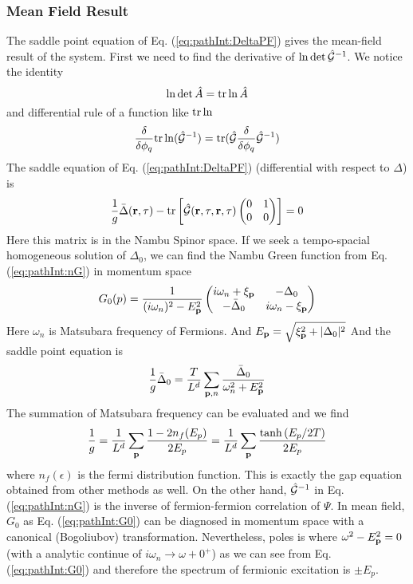 \subsubsection{Mean Field Result}
The saddle point equation of Eq. (\ref{eq:pathInt:DeltaPF}) gives the mean-field result of the system.  First we need to find the derivative of $\ln\det\hat{\mathcal{G}}^{-1}$.  We notice the identity
\begin{equation}
\ln\det\hat{A}=\text{tr}\ln\hat{A}
\end{equation}
and differential rule of a function like $\text{tr}\ln$
\begin{equation}\label{eq:pathInt:diffTr}
\frac{\delta}{\delta\phi_q}\text{tr}\ln(\hat{\mathcal{G}}^{-1})=\text{tr}(\hat{\mathcal{G}}\frac{\delta}{\delta\phi_q}\hat{\mathcal{G}}^{-1})
\end{equation}
The saddle equation of Eq. (\ref{eq:pathInt:DeltaPF}) (differential with respect to $\Delta$) is
\begin{equation}
\frac{1}{g}\bar{\Delta}(\mathbf{r},\tau)-\text{tr}\left[\hat{\mathcal{G}}(\mathbf{r},\tau,\mathbf{r},\tau)\begin{pmatrix}0&1\\0&0\end{pmatrix}\right]=0
\end{equation}
Here this matrix is in the Nambu Spinor space.  If we seek a tempo-spacial homogeneous solution of $\Delta_0$, we can find the Nambu Green function from Eq. (\ref{eq:pathInt:nG}) in momentum space
\begin{equation}\label{eq:pathInt:G0}
G_0(p)=\frac{1}{(i\omega_n)^2-E_{\mathbf{p}}^2}
\begin{pmatrix}
	i\omega_n+\xi_{\mathbf{p}}&-\Delta_0\\
	-\bar{\Delta}_0&i\omega_n-\xi_{\mathbf{p}}
\end{pmatrix}
\end{equation}
Here $\omega_n$ is Matsubara frequency of Fermions.   And $E_{\mathbf{p}}=\sqrt{\xi_{\mathbf{p}}^2+\lvert{\Delta_0}\rvert^2}$ And the saddle point equation is 
\begin{equation}
\frac{1}{g}\bar{\Delta}_0=\frac{T}{L^d}\sum_{\mathbf{p},n}\frac{\bar\Delta_0}{\omega_n^2+E_{\mathbf{p}}^2}
\end{equation}
The summation of Matsubara frequency can be evaluated and we find 
\begin{equation}
\frac{1}{g}=\frac{1}{L^d}\sum_{\mathbf{p}}\frac{1-2n_f(E_p)}{2E_p}=\frac{1}{L^d}\sum_{\mathbf{p}}\frac{\tanh{(E_p/2T)}}{2E_p}
\label{eq:pathInt:gap}
\end{equation}
where $n_f(\epsilon)$ is the fermi distribution function.  This is exactly the gap equation obtained from other methods as well.  On the other hand, $\hat{\mathcal{G}}^{-1}$ in Eq. (\ref{eq:pathInt:nG})  is the inverse of fermion-fermion correlation of $\Psi$.  In mean field, $G_{0}$ as Eq. (\ref{eq:pathInt:G0}) can be diagnosed in momentum space with a canonical (Bogoliubov) transformation.  Nevertheless, poles is where  $\omega^2-E_{\mathbf{p}}^2=0$ (with a analytic continue of $i\omega_{n}\rightarrow\omega+0^{+}$) as we can see from  Eq. (\ref{eq:pathInt:G0}) and therefore the spectrum of fermionic excitation is $\pm{}E_{p}$.  

